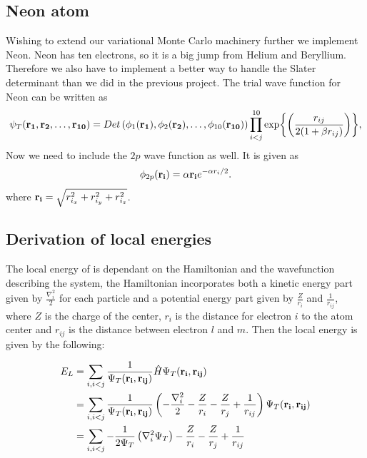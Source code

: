 \documentclass[11pt]{article}
\begin{document}
	\subsection{Neon atom}

		Wishing to extend our variational Monte Carlo machinery further we implement Neon. Neon has ten electrons, so it is a big jump from Helium and Beryllium. Therefore we also have to implement a better way to handle the Slater determinant than we did in the previous project. The trial wave function for Neon can be written as
		\begin{equation}
		   \psi_{T}({\bf r_1},{\bf r_2}, \dots,{\bf r_{10}}) =
		   Det\left(\phi_{1}({\bf r_1}),\phi_{2}({\bf r_2}),
		   \dots,\phi_{10}({\bf r_{10}})\right)
		   \prod_{i<j}^{10}\exp{\left(\frac{r_{ij}}{2(1+\beta r_{ij})}\right)},
		   \label{eq:NeonTrialFunction}
		\end{equation}
		Now we need to include the $2p$ wave function as well. It is given as
		\begin{equation}
			\phi_{2p}({\bf r_i}) = \alpha {\bf r_i}e^{-\alpha r_i/2}.
		\end{equation}
		where $ {\bf r_i} = \sqrt{r_{i_x}^2+r_{i_y}^2+r_{i_z}^2}$.

	\subsection{Derivation of local energies}
		The local energy of is dependant on the Hamiltonian and the wavefunction describing the system, the Hamiltonian incorporates both a kinetic energy part given by \( \frac{\nabla_i^2}{2} \) for each particle
		and a potential energy part given by \(\frac{Z}{r_i}\) and \(\frac{1}{r_{ij}}\), where \(Z\) is the charge of the center, \(r_i\) is the distance for electron \(i\) to the atom center and \(r_{ij}\) is the distance between electron \(l\) and \(m\). Then the local energy is given by the following:

		\begin{align}
			E_L &= \sum_{i,i<j}{\frac{1}{ \Psi_T(\vb{r_i} , \vb{r_{ij}}) } \hat{H} \Psi_T(\vb{r_i} , \vb{r_{ij}})}
			\\
			&=	\sum_{i,i<j}\frac{1}{ \Psi_T(\vb{r_i} , \vb{r_{ij}}) } \left( - \frac{\nabla_i^2}{2} -\frac{Z}{r_i}  -  \frac{Z}{r_j} +  \frac{1}{r_{ij} }  \right) \Psi_T(\vb{r_i} , \vb{r_{ij}})
			\\
			&= \sum_{i,i<j}{-\frac{1}{2\Psi_T} \left(\nabla_i^2 \Psi_T  \right)  -\frac{Z}{r_i}  -  \frac{Z}{r_j} +  \frac{1}{r_{ij} }}
		\end{align}
\end{document}
